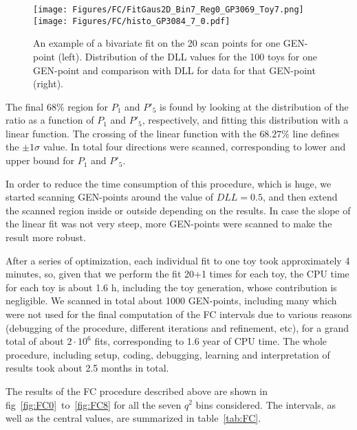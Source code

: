 \begin{figure}
  \centering
  \texttt{[image: Figures/FC/FitGaus2D\_Bin7\_Reg0\_GP3069\_Toy7.png]}
  \texttt{[image: Figures/FC/histo\_GP3084\_7\_0.pdf]}
  \caption{An example of a bivariate fit on the 20 scan points for one GEN-point (left).
    Distribution of the DLL values for the 100 toys for one GEN-point and comparison with DLL for data for that GEN-point (right).}
  \label{fig:ExampleFC}
\end{figure}

The final $68\%$ region for $P_1$ and $P'_5$ is found by looking at the distribution of the ratio as a function of $P_1$ and $P'_5$, respectively, and fitting this distribution with a linear function.
The crossing of the linear function with the $68.27\%$ line defines the $\pm1\sigma$ value.
In total four directions were scanned, corresponding to lower and upper bound for $P_1$ and $P'_5$.

In order to reduce the time consumption of this procedure, which is huge, we started scanning GEN-points around the value of $DLL=0.5$, and then extend the scanned region inside or outside depending on the results.
In case the slope of the linear fit was not very steep, more GEN-points were scanned to make the result more robust.

After a series of optimization, each individual fit to one toy took approximately 4 minutes, so, given that we perform the fit 20+1 times for each toy, the CPU time for each toy is about 1.6 h, including the toy generation, whose contribution is negligible.
We scanned in total about 1000 GEN-points, including many which were not used for the final computation of the FC intervals due to various reasons (debugging of the procedure, different iterations and refinement, etc), for a grand total of about $2\cdot{10^6}$ fits, corresponding to 1.6 year of CPU time.
The whole procedure, including setup, coding, debugging, learning and interpretation of results took about 2.5 months in total.

The results of the FC procedure described above are shown in fig~\ref{fig:FC0}~to~\ref{fig:FC8} for all the seven $q^2$ bins considered.
The intervals, as well as the central values, are summarized in table~\ref{tab:FC}.

